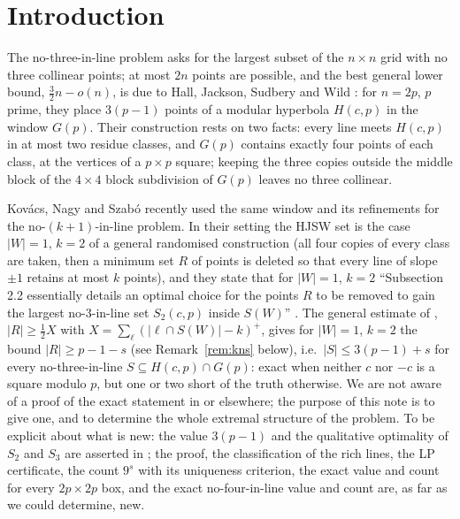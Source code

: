 \documentclass[11pt]{article}
\theoremstyle{remark}
\newcommand{\Hc}{H(c,p)}
\newcommand{\Gp}{G(p)}
\begin{document}
\section{Introduction}

The no-three-in-line problem asks for the largest subset of the $n\times n$ grid with no three collinear points; at most
$2n$ points are possible, and the best general lower bound, $\tfrac32 n-o(n)$, is due to Hall, Jackson, Sudbery and Wild
\cite{HJSW75}: for $n=2p$, $p$ prime, they place $3(p-1)$ points of a modular hyperbola $\Hc$ in the window $\Gp$.  Their
construction rests on two facts: every line meets $\Hc$ in at most two residue classes, and $\Gp$ contains exactly four
points of each class, at the vertices of a $p\times p$ square; keeping the three copies outside the middle block of the
$4\times4$ block subdivision of $\Gp$ leaves no three collinear.

Kov\'acs, Nagy and Szab\'o \cite{KNS25} recently used the same window and its refinements for the no-$(k+1)$-in-line
problem.  In their setting the HJSW set is the case $|W|=1$, $k=2$ of a general randomised construction (all four
copies of every class are taken, then a minimum set $R$ of points is deleted so that every line of slope $\pm1$ retains
at most $k$ points), and they state that for $|W|=1$, $k=2$ ``Subsection 2.2 essentially details an optimal choice for the points $R$ to be
removed to gain the largest no-3-in-line set $S_2(c,p)$ inside $S(W)$'' \cite[App.~A]{KNS25}.
The general estimate of \cite[Rem.~3.4]{KNS25}, $|R|\ge\tfrac12 X$ with $X=\sum_\ell(|\ell\cap S(W)|-k)^+$, gives for
$|W|=1$, $k=2$ the bound $|R|\ge p-1-s$ (see Remark~\ref{rem:kns} below), i.e.\ $|S|\le3(p-1)+s$ for every no-three-in-line
$S\subseteq\Hc\cap\Gp$: exact when neither $c$ nor $-c$ is a square modulo $p$, but one or two short of the truth
otherwise.  We are not aware of a proof of the exact statement in \cite{KNS25} or elsewhere; the purpose of this note is
to give one, and to determine the whole extremal structure of the problem.  To be explicit about what is new: the value
$3(p-1)$ and the qualitative optimality of $S_2$ and $S_3$ are asserted in \cite{KNS25}; the proof, the classification of
the rich lines, the LP certificate, the count $9^s$ with its uniqueness criterion, the exact value and count for every
$2p\times2p$ box, and the exact no-four-in-line value and count are, as far as we could determine, new.
\end{document}
